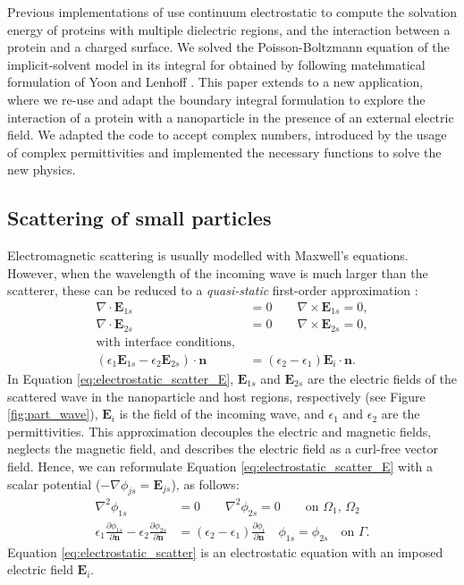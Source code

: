 Previous implementations of \pygbe use continuum electrostatic to compute the
solvation energy of proteins with multiple dielectric regions, and the
interaction between a protein and a charged surface. We solved the Poisson-Boltzmann
equation of the implicit-solvent model in its integral for obtained by following
matehmatical formulation of Yoon and Lenhoff \cite{YoonLenhoff1990}. This paper
extends \pygbe to a new application, where we re-use and adapt the boundary
integral formulation to explore the interaction of a protein with a
nanoparticle in the presence of an external electric field. We adapted the code
to accept complex numbers, introduced by the usage of complex permittivities and
implemented the necessary functions to solve the new physics. 

\subsection{Scattering of small particles} \label{sec:scattering_small}

Electromagnetic scattering is usually modelled with Maxwell's equations.
However, when the wavelength of the incoming wave is much larger than the
scatterer, these can be reduced to a \emph{quasi-static} 
first-order approximation \cite{MayergoyzZhang2007}:
%
\begin{align} \label{eq:electrostatic_scatter_E}
\nabla \cdot \mathbf{E}_{1s} &= 0 \qquad \nabla \times \mathbf{E}_{1s} = 0, \nonumber \\
\nabla \cdot \mathbf{E}_{2s} &= 0 \qquad \nabla \times \mathbf{E}_{2s} = 0, \nonumber \\
\text{with interface conditions, } \nonumber \\
(\epsilon_1\mathbf{E}_{1s} - \epsilon_2\mathbf{E}_{2s})\cdot\mathbf{n} &= (\epsilon_2-\epsilon_1)\mathbf{E}_i\cdot \mathbf{n}.
\end{align}
%
In Equation \eqref{eq:electrostatic_scatter_E}, $\mathbf{E}_{1s}$ and $\mathbf{E}_{2s}$ 
are the electric fields of the scattered wave in the nanoparticle and host regions, respectively 
(see Figure \ref{fig:part_wave}), 
$\mathbf{E}_{i}$ is the field of the incoming wave, and $\epsilon_1$ 
and $\epsilon_2$ are the permittivities.
This approximation decouples the electric and magnetic fields, neglects the magnetic field, 
and describes the electric field as a curl-free vector field.
Hence, we can reformulate Equation \eqref{eq:electrostatic_scatter_E} with a scalar potential
($-\nabla \phi_{js} = \mathbf{E}_{js}$), as follows:
%
\begin{align} \label{eq:electrostatic_scatter}
\nabla^2 \phi_{1s} &= 0 \qquad \nabla^2 \phi_{2s} = 0 \qquad\text{on $\Omega_1$, $\Omega_2$} \nonumber \\
\epsilon_1\frac{\partial\phi_{1s}}{\partial \mathbf{n}} - \epsilon_2\frac{\partial\phi_{2s}}{\partial\mathbf{n}} &= (\epsilon_2-\epsilon_1)\frac{\partial\phi_i}{\partial\mathbf{n}} \quad \phi_{1s} = \phi_{2s} \quad \text{on $\Gamma$}.
\end{align}
%
Equation \eqref{eq:electrostatic_scatter} is an electrostatic equation 
with an imposed electric field $\mathbf{E}_i$.


